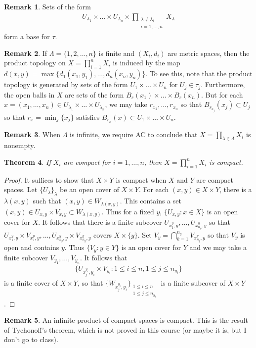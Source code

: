 \documentclass[11pt]{amsart}
\newtheorem{theorem}{Theorem}[section]
\theoremstyle{definition}
\newtheorem{remark}[theorem]{Remark}
\numberwithin{equation}{section}
\begin{document}
\begin{remark}
    Sets of the form
    \begin{align*}
        U_{\lambda_1}\times\ldots\times U_{\lambda_n}\times\prod_{\substack{\lambda\ne\lambda_i\\i=1,\ldots,n}}X_{\lambda}
    \end{align*}
    form a base for $\tau$.
\end{remark}
\begin{remark}
    If $\Lambda=\{1,2,\ldots,n\}$ is finite and $(X_i,d_i)$ are metric spaces, then the product topology on $X=\prod_{i=1}^nX_i$ is induced by the map $d(x,y)=\max\{d_1(x_1,y_1),\ldots,d_n(x_n,y_n)\}$. To see this, note that the product topology is generated by sets of the form $U_1\times \ldots\times U_n$ for $U_j\in \tau_j$. Furthermore, the open balls in $X$ are sets of the form $B_r(x_1)\times\ldots\times B_r(x_n)$. But for each $x=(x_1,\ldots,x_n)\in U_{\lambda_1}\times\ldots\times U_{\lambda_n}$, we may take $r_{x_1},\ldots,r_{x_n}$ so that $B_{r_{x_j}}(x_j)\subset U_j$ so that $r_x=\min_j\{x_j\}$ satisfies $B_{r_x}(x)\subset U_1\times\ldots \times U_n$.
\end{remark}
\begin{remark}
    When $\Lambda$ is infinite, we require AC to conclude that $X=\prod_{\lambda\in\Lambda}X_i$ is nonempty.
\end{remark}
\begin{theorem}
    If $X_i$ are compact for $i=1,\ldots,n$, then $X=\prod_{i=1}^nX_i$ is compact.
\end{theorem}
\begin{proof}
    It suffices to show that $X\times Y$ is compact when $X$ and $Y$ are compact spaces. Let $\{U_\lambda\}_\lambda$ be an open cover of $X\times Y$. For each $(x,y)\in X\times Y$, there is a $\lambda(x,y)$ such that $(x,y)\in W_{\lambda(x,y)}$. This contains a set $(x,y)\in U_{x,y}\times V_{x,y}\subset W_{\lambda(x,y)}$. Thus for a fixed $y$, $\{U_{x,y}:x\in X\}$ is an open cover for $X$. It follows that there is a finite subcover $U_{x_1^y,y},\ldots,U_{x_{n_y}^y,y}$ so that $U_{x_1^y,y}\times V_{x_1^y,y},\ldots,U_{x_{n_y}^y,y}\times V_{x_{n_y}^y,y}$ covers $X\times\{y\}$. Set $V_y=\bigcap_{k=1}^{n_y}V_{x_{n_y}^y,y}$ so that $V_y$ is open and contains $y$. Thus $\{V_y:y\in Y\}$ is an open cover for $Y$ and we may take a finite subcover $V_{y_1},\ldots,V_{y_n}$. It follows that
    \begin{align*}
        \{U_{x_{j}^{y_i},y_i}\times V_{y_i}:1\le i\le n,1\le j\le n_{y_i}\}
    \end{align*}
    is a finite cover of $X\times Y$, so that $\{W_{x_j^{y_i},y_i}\}_{\substack{1\le i\le n\\1\le j\le n_{y_i}}}$ is a finite subcover of $X\times Y$.
\end{proof}
\begin{remark}
    An infinite product of compact spaces is compact. This is the result of Tychonoff's theorem, which is not proved in this course (or maybe it is, but I don't go to class).
\end{remark}
\end{document}
